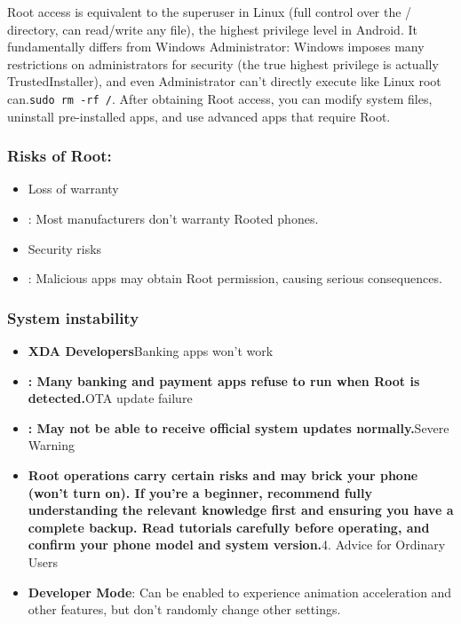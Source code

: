 
Root access is equivalent to the superuser in Linux (full control over the / directory, can read/write any file), the highest privilege level in Android. It fundamentally differs from Windows Administrator: Windows imposes many restrictions on administrators for security (the true highest privilege is actually TrustedInstaller), and even Administrator can't directly execute like Linux root can.\texttt{sudo rm -\allowbreak rf /\allowbreak *}. After obtaining Root access, you can modify system files, uninstall pre-installed apps, and use advanced apps that require Root.

\subsubsection*{Risks of Root:}

\begin{itemize}
  \item Loss of warranty
  \item : Most manufacturers don't warranty Rooted phones.
  \item Security risks
  \item : Malicious apps may obtain Root permission, causing serious consequences.
\end{itemize}

\subsubsection*{System instability}

\begin{itemize}
  \item \textbf{XDA Developers}Banking apps won't work
  \item \textbf{: Many banking and payment apps refuse to run when Root is detected.}OTA update failure
  \item \textbf{: May not be able to receive official system updates normally.}Severe Warning
  \item \textbf{Root operations carry certain risks and may brick your phone (won't turn on). If you're a beginner, recommend fully understanding the relevant knowledge first and ensuring you have a complete backup. Read tutorials carefully before operating, and confirm your phone model and system version.}4. Advice for Ordinary Users
  \item \textbf{Developer Mode}: Can be enabled to experience animation acceleration and other features, but don't randomly change other settings.
\end{itemize}

